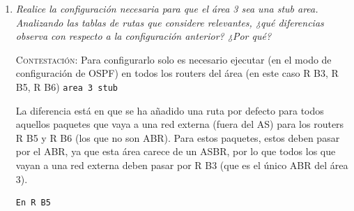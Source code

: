 \documentclass[11pt]{article}
\begin{document}
\begin{enumerate}
\begin{itemize}
    \item[-] Lo que va entre corchetes son, en primer lugar, la distancia administrativa del protocolo de enrutamiento usado (en este caso 110, OSPF), y el segundo lugar es el coste para llegar a la red destino \[\text{Coste} = \frac{10^8}{\text{ancho de banda (bps)}}\]
    \item[-] Los destinos que aparecen con una \textit{C} significan que están directamente conectados a mi router, y que se llegan a ellos por la interfaz que aparezca.
    \item[-] Las que se muestran solamente con una \textit{O} indican las rutas aprendidas por OSPF y que pertenecen a alguna de las áreas en la que está el router, y se llegan a ellas por la IP que aparece, que está conectado a la interfaz de la router que me indica.
    \item[-] Las que tienen una \textit{O IA} son como las anteriores, pero que se encuentran en una área distinta a las del router.
    \item[-] Por último, para la subred 171.84.17.80/30 aparecen dos líneas, esto quiere decir que se puede llegar a ella por dos distintos caminos, con el mismo coste para ambos.
\end{itemize}


$\hfill\square$

\vspace{12px}

\item \textit{Realice la configuración necesaria para que el área 3 sea una stub
area. Analizando las tablas de rutas que considere relevantes, ¿qué
diferencias observa con respecto a la configuración anterior? ¿Por
qué?}

\vspace{7px}

\textsc{Contestación}: 
Para configurarlo solo es necesario ejecutar (en el modo de configuración de OSPF) en todos los routers del área (en este caso R B3, R B5, R B6) \texttt{area 3 stub}

La diferencia está en que se ha añadido una ruta por defecto para todos aquellos paquetes que vaya a una red externa (fuera del AS) para los routers R B5 y R B6 (los que no son ABR). Para estos paquetes, estos deben pasar por el ABR, ya que esta área carece de un ASBR, por lo que todos los que vayan a una red externa deben pasar por R B3 (que es el único ABR del área 3).
\begin{mdframed}
\begin{verbatim}
En R B5


\end{verbatim}
\end{mdframed}
\end{enumerate}
\end{document}
